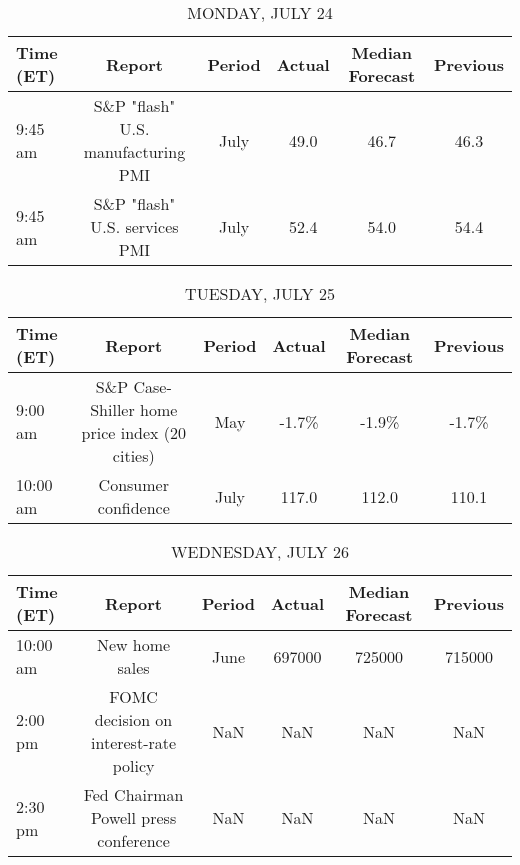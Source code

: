 \documentclass{article}%
\begin{document}
%
\normalsize%


\begin{table}[htbp]%
\caption{MONDAY, JULY 24}%
\centering%
\begin{adjustbox}{width=1\textwidth}%
\begin{tabular}{lccccc}
\toprule
Time (ET) &                             Report & Period & Actual & Median Forecast & Previous \\
\midrule
  9:45 am & S\&P "flash" U.S. manufacturing PMI &   July &   49.0 &            46.7 &     46.3 \\
  9:45 am &      S\&P "flash" U.S. services PMI &   July &   52.4 &            54.0 &     54.4 \\
\bottomrule
\end{tabular}
%
\end{adjustbox}%
\end{table}

%


\begin{table}[htbp]%
\caption{TUESDAY, JULY 25}%
\centering%
\begin{adjustbox}{width=1\textwidth}%
\begin{tabular}{lccccc}
\toprule
Time (ET) &                                        Report & Period & Actual & Median Forecast & Previous \\
\midrule
  9:00 am & S\&P Case-Shiller home price index (20 cities) &    May &  -1.7\% &           -1.9\% &    -1.7\% \\
 10:00 am &                           Consumer confidence &   July &  117.0 &           112.0 &    110.1 \\
\bottomrule
\end{tabular}
%
\end{adjustbox}%
\end{table}

%


\begin{table}[htbp]%
\caption{WEDNESDAY, JULY 26}%
\centering%
\begin{adjustbox}{width=1\textwidth}%
\begin{tabular}{lccccc}
\toprule
Time (ET) &                                Report & Period & Actual & Median Forecast & Previous \\
\midrule
 10:00 am &                        New home sales &   June & 697000 &          725000 &   715000 \\
  2:00 pm & FOMC decision on interest-rate policy &    NaN &    NaN &             NaN &      NaN \\
  2:30 pm &  Fed Chairman Powell press conference &    NaN &    NaN &             NaN &      NaN \\
\bottomrule
\end{tabular}
%
\end{adjustbox}%
\end{table}
\end{document}
